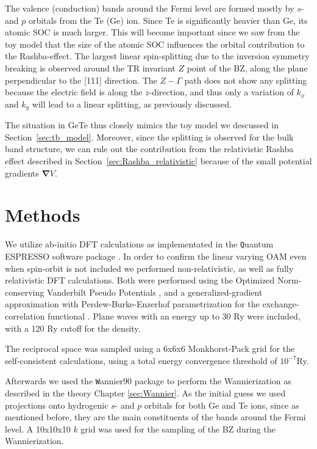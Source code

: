 The valence (conduction) bands around the Fermi level are formed mostly by $s$- and $p$ orbitals from the Te (Ge) ion.
Since Te is significantly heavier than Ge, its atomic SOC is much larger. This will become important since we saw from the toy model that the size of the atomic SOC influences the orbital contribution to the Rashba-effect. 
The largest linear spin-splitting due to the inversion symmetry breaking is observed around the TR invariant $Z$ point of the BZ, along the plane perpendicular to the [111] direction.
The $Z-\Gamma$ path does not show any splitting because the electric field is along the $z$-direction, and thus only a variation of $k_x$ and $k_y$ will lead to a linear splitting, as previously discussed.

The situation in GeTe thus closely mimics the toy model we descussed in Section~\ref{sec:tb_model}.
Moreover, since the splitting is observed for the bulk band structure, we can rule out the contribution from the relativistic Rashba effect described in Section~\ref{sec:Rashba_relativistic} because of the small potential gradients $\bm{\nabla}V$.

\section{Methods}
We utilize ab-initio DFT calculations as implementated in the {\texttt Quantum ESPRESSO} software package \cite{Giannozzi2009}.
In order to confirm the linear varying OAM even when spin-orbit is not included we performed non-relativistic, as well as fully relativistic DFT calculations.
Both were performed using the Optimized Norm-conserving Vanderbilt Pseudo Potentials \cite{Hamann2013}, and a generalized-gradient approximation with Perdew-Burke-Enzerhof parametrization for the exchange-correlation functional \cite{Perdew1996}.
Plane waves with an energy up to 30 Ry were included, with a 120 Ry cutoff for the density.

The reciprocal space was sampled using a 6x6x6 Monkhorst-Pack grid \cite{Pack1977} for the self-consistent calculations, using a total energy convergence threshold of $10^{-7}$Ry.

Afterwards we used the {\texttt Wannier90} package \cite{Mostofi2014AnFunctions} to perform the Wannierization as described in the theory Chapter \ref{sec:Wannier}.
As the initial guess we used projections onto hydrogenic $s$- and $p$ orbitals for both Ge and Te ions, since as mentioned before, they are the main constituents of the bands around the Fermi level.
A 10x10x10 $k$ grid was used for the sampling of the BZ during the Wannierization. 

